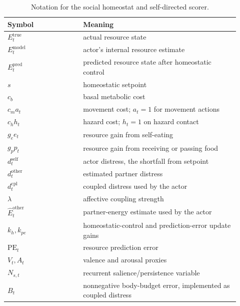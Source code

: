 \documentclass[letterpaper]{article}
\begin{document}
\begin{table}[t]
\centering
\small
\begin{tabular}{@{}>{\raggedright\arraybackslash}p{0.30\linewidth}>{\raggedright\arraybackslash}p{0.62\linewidth}@{}}
\toprule
Symbol & Meaning \\
\midrule
$E^{\mathrm{true}}_t$ & actual resource state \\
$E^{\mathrm{model}}_t$ & actor's internal resource estimate \\
$E^{\mathrm{pred}}_t$ & predicted resource state after homeostatic control \\
$s$ & homeostatic setpoint \\
$c_b$ & basal metabolic cost \\
$c_m a_t$ & movement cost; $a_t=1$ for movement actions \\
$c_h h_t$ & hazard cost; $h_t=1$ on hazard contact \\
$g_e e_t$ & resource gain from self-eating \\
$g_p p_t$ & resource gain from receiving or passing food \\
$d^{\mathrm{self}}_t$ & actor distress, the shortfall from setpoint \\
$d^{\mathrm{other}}_t$ & estimated partner distress \\
$d^{\mathrm{cpl}}_t$ & coupled distress used by the actor \\
$\lambda$ & affective coupling strength \\
$\hat E^{\mathrm{other}}_t$ & partner-energy estimate used by the actor \\
$k_h,k_{pe}$ & homeostatic-control and prediction-error update gains \\
$\mathrm{PE}_t$ & resource prediction error \\
$V_t,A_t$ & valence and arousal proxies \\
$N_{s,t}$ & recurrent salience/persistence variable \\
$B_t$ & nonnegative body-budget error, implemented as coupled distress \\
\bottomrule
\end{tabular}
\caption{Notation for the social homeostat and self-directed scorer.}
\label{tab:notation}
\end{table}
\end{document}

